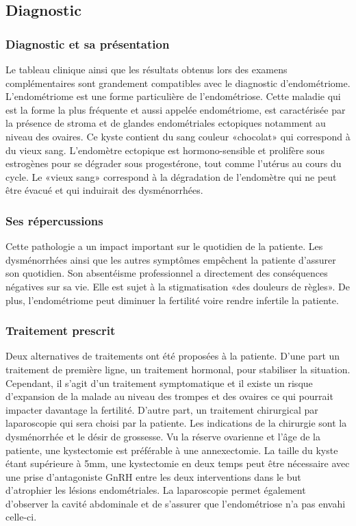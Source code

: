 \subsection{Diagnostic}

\subsubsection{Diagnostic et sa présentation}
Le tableau clinique ainsi que les résultats obtenus lors des examens complémentaires sont grandement compatibles avec le diagnostic d’endométriome. L’endométriome est une forme particulière de l’endométriose. Cette maladie qui est la forme la plus fréquente et aussi appelée endométriome, est caractérisée par la présence de stroma et de glandes endométriales ectopiques notamment au niveau des ovaires. Ce kyste contient du sang couleur «chocolat» qui correspond à du vieux sang. L’endomètre ectopique est hormono-sensible et prolifère sous estrogènes pour se dégrader sous progestérone, tout comme l’utérus au cours du cycle. Le «vieux sang» correspond à la dégradation de l’endomètre qui ne peut être évacué et qui induirait des dysménorrhées.

\subsubsection{Ses répercussions}
Cette pathologie a un impact important sur le quotidien de la patiente. Les dysménorrhées ainsi que les autres symptômes empêchent la patiente d’assurer son quotidien. Son absentéisme professionnel a directement des conséquences négatives sur sa vie. Elle est sujet à la stigmatisation «des douleurs de règles». De plus, l’endométriome peut diminuer la fertilité voire rendre infertile la patiente.

\subsubsection{Traitement prescrit}
Deux alternatives de traitements ont été proposées à la patiente. D’une part un traitement de première ligne, un traitement hormonal, pour stabiliser la situation. Cependant, il s’agit d’un traitement symptomatique et il existe un risque d’expansion de la malade au niveau des trompes et des ovaires ce qui pourrait impacter davantage la fertilité. D’autre part, un traitement chirurgical par laparoscopie qui sera choisi par la patiente. Les indications de la chirurgie sont la dysménorrhée et le désir de grossesse. Vu la réserve ovarienne et l’âge de la patiente, une kystectomie est préférable à une annexectomie. La taille du kyste étant supérieure à 5mm, une kystectomie en deux temps peut être nécessaire avec une prise d’antagoniste GnRH entre les deux interventions dans le but d’atrophier les lésions endométriales. La laparoscopie permet également d’observer la cavité abdominale et de s’assurer que l’endométriose n’a pas envahi celle-ci.